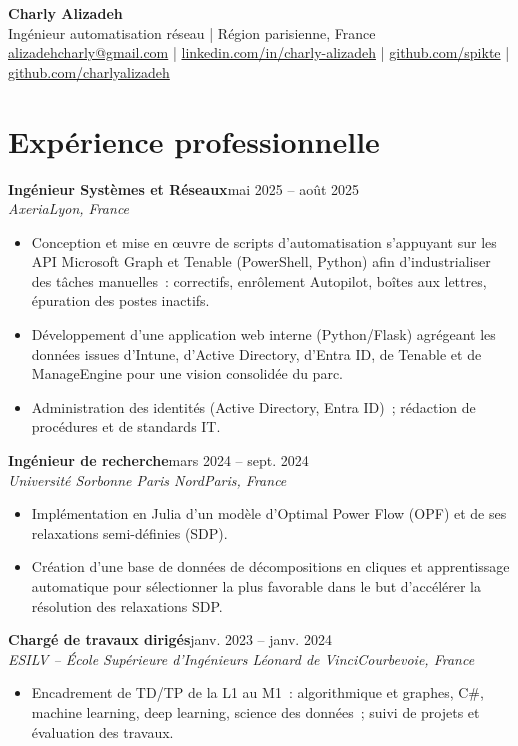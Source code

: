 \documentclass[9pt,a4paper]{extarticle}
\newcommand{\entry}[4]{%
  \textbf{#1}\hfill #2\\[-0.1em]
  \textit{#3}\hfill \textit{#4}\par\vspace{0.1em}}
\begin{document}
\begin{center}
  {\LARGE\bfseries Charly Alizadeh}\\[0.3em]
  Ingénieur automatisation réseau \;|\; Région parisienne, France\\[0.2em]
  \href{mailto:alizadehcharly@gmail.com}{alizadehcharly@gmail.com} \;|\;
  \href{https://www.linkedin.com/in/charly-alizadeh}{linkedin.com/in/charly-alizadeh} \;|\;
  \href{https://github.com/spikte}{github.com/spikte} \;|\;
  \href{https://github.com/charlyalizadeh}{github.com/charlyalizadeh}
\end{center}

\section{Expérience professionnelle}

\entry{Ingénieur Systèmes et Réseaux}{mai 2025 -- août 2025}{Axeria}{Lyon, France}
\begin{itemize}
  \item Conception et mise en œuvre de scripts d'automatisation s'appuyant sur les API Microsoft Graph et Tenable
        (PowerShell, Python) afin d'industrialiser des tâches manuelles~: correctifs, enrôlement Autopilot,
        boîtes aux lettres, épuration des postes inactifs.
  \item Développement d'une application web interne (Python/Flask) agrégeant les données issues d'Intune,
        d'Active Directory, d'Entra ID, de Tenable et de ManageEngine pour une vision consolidée du parc.
  \item Administration des identités (Active Directory, Entra ID)~; rédaction de procédures et de standards IT.
\end{itemize}


\entry{Ingénieur de recherche}{mars 2024 -- sept. 2024}{Université Sorbonne Paris Nord}{Paris, France}
\begin{itemize}
  \item Implémentation en Julia d'un modèle d'Optimal Power Flow (OPF) et de ses relaxations semi-définies (SDP).
  \item Création d'une base de données de décompositions en cliques et apprentissage automatique pour sélectionner la plus
        favorable dans le but d'accélérer la résolution des relaxations SDP.
\end{itemize}


\entry{Chargé de travaux dirigés}{janv. 2023 -- janv. 2024}{ESILV -- École Supérieure d'Ingénieurs Léonard de Vinci}{Courbevoie, France}
\begin{itemize}
  \item Encadrement de TD/TP de la L1 au M1~: algorithmique et graphes, C\#, machine learning, deep learning,
        science des données~; suivi de projets et évaluation des travaux.
\end{itemize}
\end{document}
